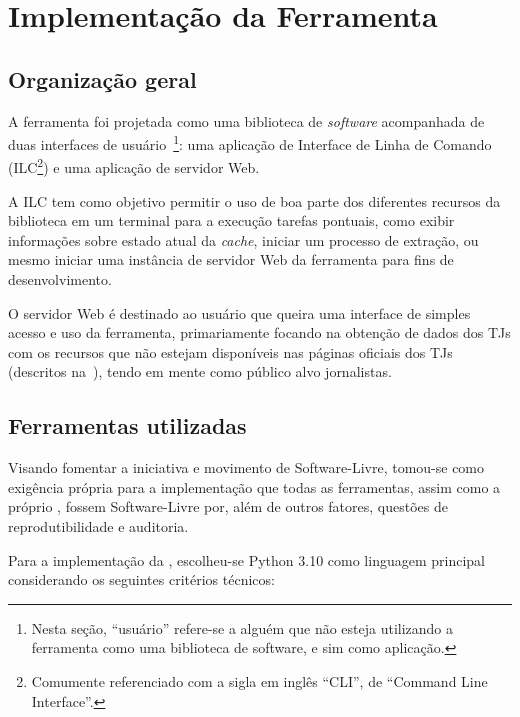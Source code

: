 \chapter{Implementação da Ferramenta \tjscraper~\label{chp:implementação-da-ferramenta}}

\section{Organização geral}

A ferramenta foi projetada como uma biblioteca de \textit{software} acompanhada
de duas interfaces de usuário~\footnote{Nesta seção, ``usuário'' refere-se a
alguém que não esteja utilizando a ferramenta como uma biblioteca de software,
e sim como aplicação.}: uma aplicação de Interface de Linha de Comando
(ILC\footnote{Comumente referenciado com a sigla em inglês ``CLI'', de
``Command Line Interface''.}) e uma aplicação de servidor Web.

A ILC tem como objetivo permitir o uso de boa parte dos diferentes recursos da
biblioteca em um terminal para a execução tarefas pontuais, como exibir
informações sobre estado atual da \textit{cache}, iniciar um processo de
extração, ou mesmo iniciar uma instância de servidor Web da ferramenta para
fins de desenvolvimento.

O servidor Web é destinado ao usuário que queira uma interface de simples
acesso e uso da ferramenta, primariamente focando na obtenção de dados dos TJs
com os recursos que não estejam disponíveis nas páginas oficiais dos TJs
(descritos na~), tendo em mente como público
alvo jornalistas.

\section{Ferramentas utilizadas~\label{section:ferramentas-utilizadas}}

Visando fomentar a iniciativa e movimento de Software-Livre, tomou-se como
exigência própria para a implementação que todas as ferramentas, assim como a
próprio \tjscraper, fossem Software-Livre por, além de outros fatores, questões
de reprodutibilidade e auditoria.

Para a implementação da \tjscraper, escolheu-se Python 3.10 como linguagem
principal considerando os seguintes critérios técnicos:

